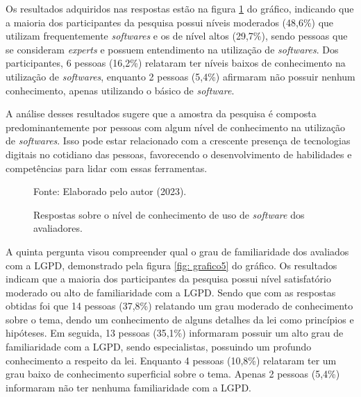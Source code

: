 \documentclass[
	12pt,				%
	openright,			%
	oneside,			%
	a4paper,			%
	english,			%
	french,				%
	spanish,			%
	brazil,				%
	]{abntex2}
\begin{document}
Os resultados adquiridos nas respostas estão na figura \ref{fig: grafico4} do gráfico, indicando que a maioria dos participantes da pesquisa possui níveis moderados (48,6\%) que utilizam frequentemente \textit{softwares} e os de nível altos (29,7\%), sendo pessoas que se consideram \textit{experts} e possuem  entendimento na utilização de \textit{softwares}. Dos participantes, 6 pessoas (16,2\%) relataram ter níveis baixos de conhecimento na utilização de \textit{softwares}, enquanto 2 pessoas (5,4\%) afirmaram não possuir nenhum conhecimento, apenas utilizando o básico de \textit{software}.

A análise desses resultados sugere que a amostra da pesquisa é composta predominantemente por pessoas com algum nível de conhecimento na utilização de \textit{softwares}. Isso pode estar relacionado com a crescente presença de tecnologias digitais no cotidiano das pessoas, favorecendo o desenvolvimento de habilidades e competências para lidar com essas ferramentas.

\begin{figure}[ht]
    \centering
    \caption{Respostas sobre o nível de conhecimento de uso de \textit{software} dos avaliadores.}
    \label{fig: grafico4}
    
    \centering \small Fonte: Elaborado pelo autor (2023).
\end{figure}

A quinta pergunta visou compreender qual o grau de familiaridade dos avaliados com a LGPD, demonstrado pela figura \ref{fig: grafico5} do gráfico. Os resultados indicam que a maioria dos participantes da pesquisa possui nível satisfatório moderado ou alto de familiaridade com a LGPD. Sendo que com as respostas obtidas foi que 14 pessoas (37,8\%) relatando um grau moderado de conhecimento sobre o tema, dendo um conhecimento de alguns detalhes da lei como princípios e hipóteses. Em seguida, 13 pessoas (35,1\%) informaram possuir um alto grau de familiaridade com a LGPD, sendo especialistas, possuindo um profundo conhecimento a respeito da lei. Enquanto 4 pessoas (10,8\%) relataram ter um grau baixo de conhecimento superficial sobre o tema. Apenas 2 pessoas (5,4\%) informaram não ter nenhuma familiaridade com a LGPD. 
\end{document}
